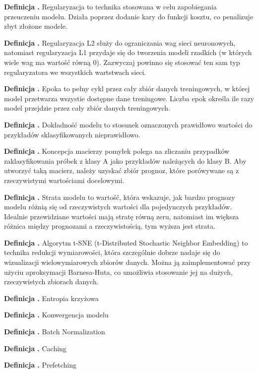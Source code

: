 \noindent
\textbf{Definicja \mlDefinitionIndex.}
\incrementMlDefinitionIndex
Regularyzacja to technika stosowana w celu zapobiegania przeuczeniu modelu.
Działa poprzez dodanie kary do funkcji kosztu, co penalizuje zbyt złożone modele.

\noindent
\textbf{Definicja \mlDefinitionIndex.}
\incrementMlDefinitionIndex
Regularyzacja L2 służy do ograniczania wag sieci neuronowych,
natomiast regularyzacja L1 przydaje się do tworzenia modeli rzadkich (w których wiele wag ma wartość równą 0). 
Zazwyczaj powinno się stosować ten sam typ regularyzatora we wszystkich wartstwach sieci.

\noindent
\textbf{Definicja \mlDefinitionIndex.}
\incrementMlDefinitionIndex
Epoka to pełny cykl przez cały zbiór danych treningowych, w której model przetwarza wszystie dostępne dane treningowe.
Liczba epok określa ile razy model przejdzie przez cały zbiór danych treningowych.

\noindent
\textbf{Definicja \mlDefinitionIndex.}
\incrementMlDefinitionIndex
Dokładność modelu to stosunek oznaczonych prawidłowo wartości do przykładów sklasyfikowanych nieprawidłowo.

\noindent
\textbf{Definicja \mlDefinitionIndex.}
\incrementMlDefinitionIndex
Koncepcja macierzy pomyłek polega na zliczaniu przypadków zaklasyfikowania próbek z klasy A jako przykładów należących do klasy B.
Aby utworzyć taką macierz, należy uzyskać zbiór prognoz, które porówywane są z rzeczywistymi wartościami docelowymi.

\noindent
\textbf{Definicja \mlDefinitionIndex.}
\incrementMlDefinitionIndex
Strata modelu to wartość, która wskazuje,
jak bardzo prognozy modelu różnią się od rzeczywistych wartości dla pojedynczych przykładów.
Idealnie przewidziane wartości mają stratę równą zeru,
natomiast im większa różnica między prognozami a rzeczywistością, tym wyższa jest strata.

\noindent
\textbf{Definicja \mlDefinitionIndex.}
\incrementMlDefinitionIndex
Algorytm t-SNE (t-Distributed Stochastic Neighbor Embedding) to technika redukcji wymiarowości,
która szczególnie dobrze nadaje się do wizualizacji wielowymiarowych zbiorów danych.
Można ją zaimplementować przy użyciu aproksymacji Barnesa-Huta,
co umożliwia stosowanie jej na dużych, rzeczywistych zbiorach danych.

\noindent
\textbf{Definicja \mlDefinitionIndex.}
\incrementMlDefinitionIndex
Entropia krzyżowa %

\noindent
\textbf{Definicja \mlDefinitionIndex.}
\incrementMlDefinitionIndex
Konwergencja modelu %

\noindent
\textbf{Definicja \mlDefinitionIndex.}
\incrementMlDefinitionIndex
Batch Normalization %

\noindent
\textbf{Definicja \mlDefinitionIndex.}
\incrementMlDefinitionIndex
Caching %

\noindent
\textbf{Definicja \mlDefinitionIndex.}
\incrementMlDefinitionIndex
Prefetching %